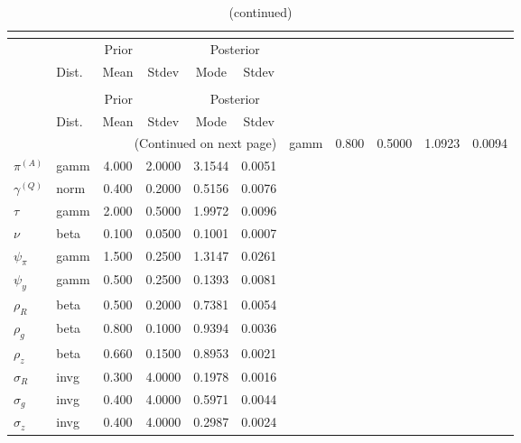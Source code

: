  
\begin{center}
\begin{longtable}{llcccc} 
\caption{Results from posterior maximization (parameters)}\\
 \label{Table:Posterior:1}\\
\toprule 
  & \multicolumn{3}{c}{Prior}  &  \multicolumn{2}{c}{Posterior} \\
  \cmidrule(r{.75em}){2-4} \cmidrule(r{.75em}){5-6}
  & Dist. & Mean  & Stdev & Mode & Stdev \\ 
\midrule \endfirsthead 
\caption{(continued)}\\
 \bottomrule 
  & \multicolumn{3}{c}{Prior}  &  \multicolumn{2}{c}{Posterior} \\
  \cmidrule(r{.75em}){2-4} \cmidrule(r{.75em}){5-6}
  & Dist. & Mean  & Stdev & Mode & Stdev \\ 
\midrule \endhead 
\bottomrule \multicolumn{6}{r}{(Continued on next page)}\endfoot 
\bottomrule\endlastfoot 
${r_{A}}$ & gamm &   0.800 & 0.5000 &   1.0923 &  0.0094 \\ 
${\pi^{(A)}}$ & gamm &   4.000 & 2.0000 &   3.1544 &  0.0051 \\ 
${\gamma^{(Q)}}$ & norm &   0.400 & 0.2000 &   0.5156 &  0.0076 \\ 
${\tau}$ & gamm &   2.000 & 0.5000 &   1.9972 &  0.0096 \\ 
${\nu}$ & beta &   0.100 & 0.0500 &   0.1001 &  0.0007 \\ 
${\psi_\pi}$ & gamm &   1.500 & 0.2500 &   1.3147 &  0.0261 \\ 
${\psi_y}$ & gamm &   0.500 & 0.2500 &   0.1393 &  0.0081 \\ 
${\rho_R}$ & beta &   0.500 & 0.2000 &   0.7381 &  0.0054 \\ 
${\rho_{g}}$ & beta &   0.800 & 0.1000 &   0.9394 &  0.0036 \\ 
${\rho_z}$ & beta &   0.660 & 0.1500 &   0.8953 &  0.0021 \\ 
${\sigma_R}$ & invg &   0.300 & 4.0000 &   0.1978 &  0.0016 \\ 
${\sigma_{g}}$ & invg &   0.400 & 4.0000 &   0.5971 &  0.0044 \\ 
${\sigma_z}$ & invg &   0.400 & 4.0000 &   0.2987 &  0.0024 \\ 
\end{longtable}
 \end{center}
